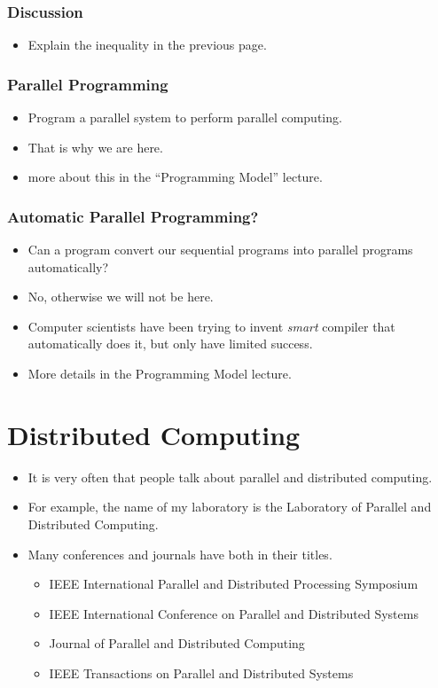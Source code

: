 \documentclass{beamer}
\begin{document}
\begin{CJK}{UTF8}{bsmi}
  \begin{frame}
    \frametitle{Discussion} 
    \begin{itemize}
    \item Explain the inequality in the previous page.
    \end{itemize}
  \end{frame}

  \begin{frame}
    \frametitle{Parallel Programming} 
    \begin{itemize}
    \item Program a parallel system to perform parallel computing.
    \item That is why we are here.
    \item more about this in the ``Programming Model'' lecture.
    \end{itemize}
  \end{frame}

  \begin{frame}
    \frametitle{Automatic Parallel Programming?} 
    \begin{itemize}
    \item Can a program convert our sequential programs into parallel
      programs automatically?
    \item No, otherwise we will not be here.
    \item Computer scientists have been trying to invent {\em smart} compiler that automatically does it, but only have limited success.
    \item More details in the Programming Model lecture.
    \end{itemize}
  \end{frame}

  \section{Distributed Computing}

  \begin{frame}
    \begin{itemize}
    \item It is very often that people talk about parallel and distributed
      computing.
    \item For example, the name of my laboratory is the Laboratory of Parallel and Distributed Computing.
    \item Many conferences and journals have both in their titles.
      \begin{itemize}
      \item IEEE International Parallel and Distributed Processing Symposium
      \item IEEE International Conference on Parallel and Distributed Systems
      \item Journal of Parallel and Distributed Computing
      \item IEEE Transactions on Parallel and Distributed Systems
      \end{itemize}
    \end{itemize}
  \end{frame}


\end{CJK}
\end{document}
